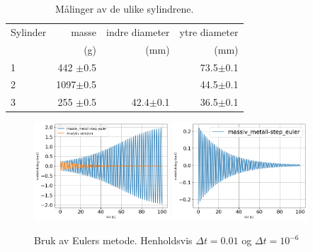\documentclass[5p]{elsarticle}
\begin{document}
\begin{table}[h]
	\begin{center}
		\caption{Målinger av de ulike sylindrene.}
		\label{MinLilleTabell}	%
		\begin{tabular}{lrrr} 		%
			\hline 								%
		    Sylinder &  masse  & indre diameter & ytre diameter \\ %
			&  (g)    &   (mm)   &  (mm)    \\ %
			\hline												
			1   &  442 \(\pm\)0.5 & 	  & 73.5\(\pm\)0.1 \\ %
			2   &  1097\(\pm\)0.5 & 	  & 44.5\(\pm\)0.1 \\ %
			3   &  255 \(\pm\)0.5 & 42.4\(\pm\)0.1 & 36.5\(\pm\)0.1 \\ %
			\hline
		\end{tabular}
	\end{center}
\end{table}


\begin{figure}[h] 
	\begin{center}
        	\includegraphics[width=0.45\textwidth]{Plots/Saved-Plots/combined-analytic/massiv_metall-step_euler.png}
        	\includegraphics[width=0.45\textwidth]{Plots/Saved-Plots/step_euler-2b-small_dt/massiv_metall-step_euler-plot.png}
        \end{center}
	\caption{Bruk av Eulers metode. Henholdsvis \(\Delta t = 0.01\) og \(\Delta t = 10^{-6}\)}
	\label{Fig step-Euler} %
\end{figure}
\end{document}
